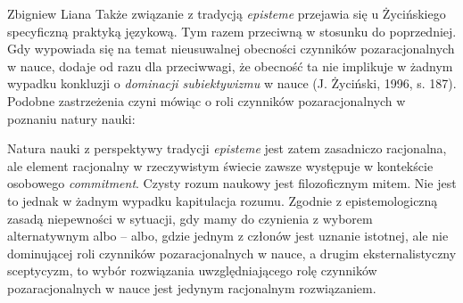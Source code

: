\begin{artplenv}{Zbigniew Liana}
Także związanie z tradycją \textit{episteme} przejawia się u Życińskiego specyficzną praktyką językową. Tym razem
przeciwną w stosunku do poprzedniej. Gdy wypowiada się na temat nieusuwalnej obecności czynników pozaracjonalnych w
nauce, dodaje od razu  dla przeciwwagi, że obecność ta nie implikuje w żadnym wypadku konkluzji o \textit{dominacji
	subiektywizmu} w nauce \label{ref:RND5RKyXkJozz}(J. Życiński, 1996, s. 187). Podobne zastrzeżenia czyni  mówiąc o roli
czynników pozaracjonalnych w poznaniu natury nauki:


Natura nauki z perspektywy tradycji \textit{episteme} jest zatem zasadniczo racjonalna, ale element racjonalny w
rzeczywistym świecie zawsze występuje w kontekście osobowego \textit{commitment}. Czysty rozum naukowy jest filozoficznym
mitem. Nie jest to jednak w żadnym wypadku kapitulacja rozumu. Zgodnie z epistemologiczną zasadą niepewności w
sytuacji, gdy mamy do czynienia z wyborem alternatywnym albo -- albo, gdzie jednym z członów jest uznanie istotnej, ale
nie dominującej roli czynników pozaracjonalnych w nauce, a drugim eksternalistyczny sceptycyzm, to wybór rozwiązania
uwzględniającego rolę czynników pozaracjonalnych w nauce jest jedynym racjonalnym rozwiązaniem.




%
%
%
%
%
%
%
%
%
%
%
%
%
%
%
%
%
%
%



\end{artplenv}